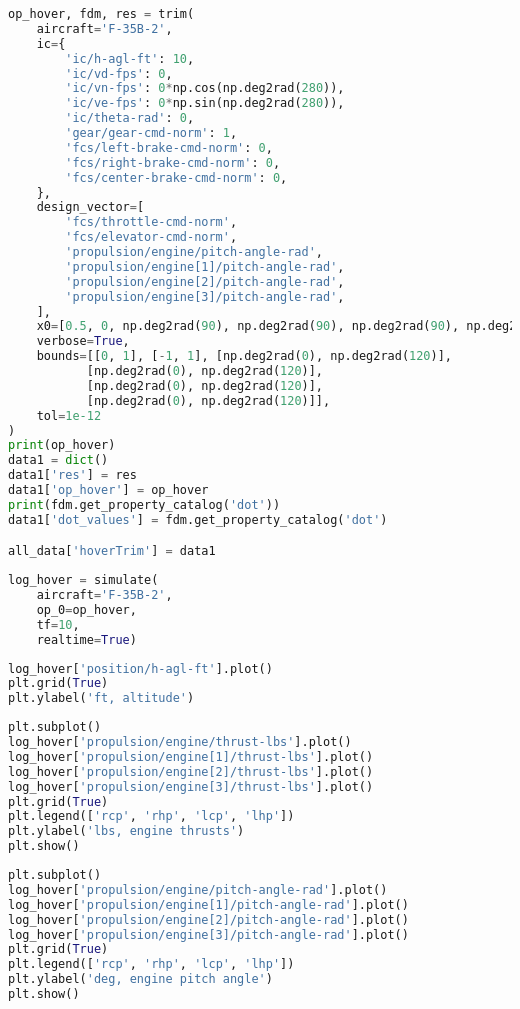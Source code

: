 \begin{lstlisting}[language=Python]
op_hover, fdm, res = trim(
    aircraft='F-35B-2',
    ic={
        'ic/h-agl-ft': 10,
        'ic/vd-fps': 0,
        'ic/vn-fps': 0*np.cos(np.deg2rad(280)),
        'ic/ve-fps': 0*np.sin(np.deg2rad(280)),
        'ic/theta-rad': 0,
        'gear/gear-cmd-norm': 1,
        'fcs/left-brake-cmd-norm': 0,
        'fcs/right-brake-cmd-norm': 0,
        'fcs/center-brake-cmd-norm': 0,
    },
    design_vector=[
        'fcs/throttle-cmd-norm',
        'fcs/elevator-cmd-norm',
        'propulsion/engine/pitch-angle-rad',
        'propulsion/engine[1]/pitch-angle-rad',
        'propulsion/engine[2]/pitch-angle-rad',
        'propulsion/engine[3]/pitch-angle-rad',
    ],
    x0=[0.5, 0, np.deg2rad(90), np.deg2rad(90), np.deg2rad(90), np.deg2rad(90)],
    verbose=True,
    bounds=[[0, 1], [-1, 1], [np.deg2rad(0), np.deg2rad(120)], 
           [np.deg2rad(0), np.deg2rad(120)],
           [np.deg2rad(0), np.deg2rad(120)],
           [np.deg2rad(0), np.deg2rad(120)]],
    tol=1e-12
)
print(op_hover)
data1 = dict()
data1['res'] = res
data1['op_hover'] = op_hover
print(fdm.get_property_catalog('dot'))
data1['dot_values'] = fdm.get_property_catalog('dot')

all_data['hoverTrim'] = data1
\end{lstlisting}

\begin{lstlisting}[language=Python]
log_hover = simulate(
    aircraft='F-35B-2',
    op_0=op_hover,
    tf=10,
    realtime=True)
\end{lstlisting}

\begin{lstlisting}[language=Python]
log_hover['position/h-agl-ft'].plot()
plt.grid(True)
plt.ylabel('ft, altitude')
\end{lstlisting}

\begin{lstlisting}[language=Python]
plt.subplot()
log_hover['propulsion/engine/thrust-lbs'].plot()
log_hover['propulsion/engine[1]/thrust-lbs'].plot()
log_hover['propulsion/engine[2]/thrust-lbs'].plot()
log_hover['propulsion/engine[3]/thrust-lbs'].plot()
plt.grid(True)
plt.legend(['rcp', 'rhp', 'lcp', 'lhp'])
plt.ylabel('lbs, engine thrusts')
plt.show()
\end{lstlisting}

\begin{lstlisting}[language=Python]
plt.subplot()
log_hover['propulsion/engine/pitch-angle-rad'].plot()
log_hover['propulsion/engine[1]/pitch-angle-rad'].plot()
log_hover['propulsion/engine[2]/pitch-angle-rad'].plot()
log_hover['propulsion/engine[3]/pitch-angle-rad'].plot()
plt.grid(True)
plt.legend(['rcp', 'rhp', 'lcp', 'lhp'])
plt.ylabel('deg, engine pitch angle')
plt.show()
\end{lstlisting}

